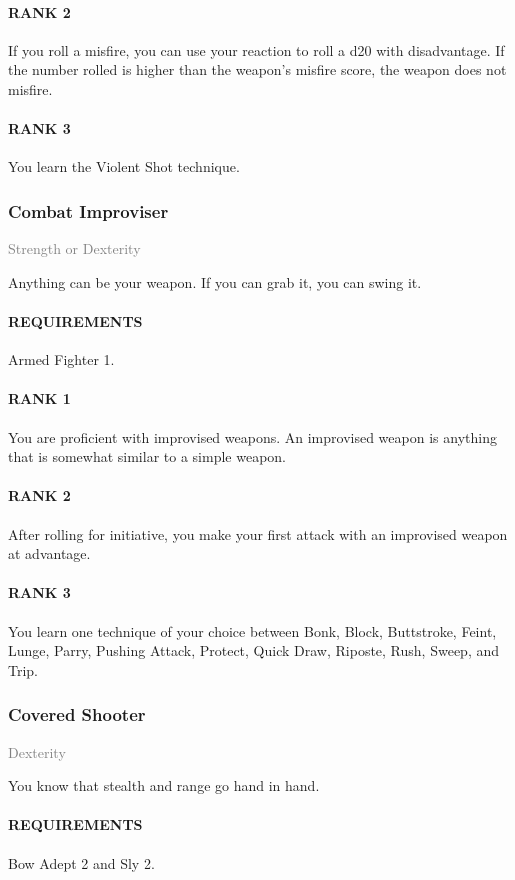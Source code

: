 \paragraph{RANK 2} If you roll a misfire, you can use your reaction to roll a d20 with disadvantage.
If the number rolled is higher than the weapon's misfire score, the weapon does not misfire.
\paragraph{RANK 3} You learn the Violent Shot technique.
\subsubsection{Combat Improviser} \label{feat::combatimproviser}
\small{\textcolor{gray}{Strength or Dexterity}}

\normalsize
Anything can be your weapon.
If you can grab it, you can swing it.
\paragraph{REQUIREMENTS} Armed Fighter 1.
\paragraph{RANK 1} You are proficient with improvised weapons.
An improvised weapon is anything that is somewhat similar to a simple weapon.
\paragraph{RANK 2} After rolling for initiative, you make your first attack with an improvised weapon at advantage.
\paragraph{RANK 3} You learn one technique of your choice between Bonk, Block, Buttstroke, Feint, Lunge, Parry, Pushing Attack, Protect, Quick Draw, Riposte, Rush, Sweep, and Trip.

\subsubsection{Covered Shooter} \label{feat::coveredshooter}
\small{\textcolor{gray}{Dexterity}}

\normalsize
You know that stealth and range go hand in hand.
\paragraph{REQUIREMENTS} Bow Adept 2 and Sly 2.
